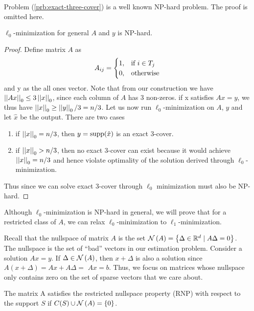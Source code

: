 \documentclass[11pt]{article}
\begin{document}
\begin{remark}
    Problem (\ref{prb:exact-three-cover}) is a well known NP-hard problem. The proof is omitted here.
\end{remark}

\begin{theorem}
    $\ell_0$-minimization for general $A$ and $y$ is NP-hard.
\end{theorem}
\begin{proof}
    Define matrix $A$ as
    \[A_{ij}=\begin{cases}
        1, & \text{if } i \in T_j\\
        0, & \textnormal{otherwise}
    \end{cases}\]
    and y as the all ones vector. Note that from our construction we have $\left|\left|Ax\right|\right|_0 \leq 3\left|\left|x\right|\right|_0$, since each column of $A$ has 3 non-zeros. if x satisfies $Ax = y$, we thus have $\left|\left|x\right|\right|_0 \geq \left|\left|y\right|\right|_0/3 = n/3$. Let us now run $\ell_0$-minimization on $A$, $y$ and let \(\hat{x}\) be the output. There are two cases
    \begin{enumerate}
        \item if $\left|\left|x\right|\right|_0 = n/3$, then $y = \operatorname{supp}(\hat{x})$ is an exact 3-cover.
        \item if $\left|\left|x\right|\right|_0 > n/3$, then no exact 3-cover can exist because it would achieve $\left|\left|x\right|\right|_0 = n/3$ and hence violate optimality of the solution derived through $\ell_0$-minimization.
    \end{enumerate}
    Thus since we can solve exact 3-cover through $\ell_0$ minimization must also be NP-hard.
\end{proof}

Although $\ell_0$-minimization is NP-hard in general, we will prove that for a restricted class of $A$, we can relax $\ell_0$-minimization to \(\ell_1\)-minimization.

Recall that the nullspace of matrix $A$ is the set $\mathcal N\left(A\right)=\left\{\Delta \in\mathbb R^d \mid A \Delta=0\right\}$. The nullspace is the set of ``bad'' vectors in our estimation problem. Consider a solution $A x=y$. If $\Delta \in\mathcal N\left(A\right)$, then $x+\Delta$ is also a solution since $A(x+\Delta)=A x+A \Delta=$ $A x=b$. Thus, we focus on matrices whose nullspace only contains zero on the set of sparse vectors that we care about.

\begin{definition}
    The matrix A satisfies the restricted nullspace property (RNP) with respect to the support \(S\) if $C(S) \cup \mathcal N\left(A\right)=\{0\}$.
\end{definition} 
\end{document}
